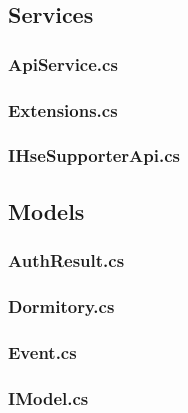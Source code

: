 \documentclass{../includes/TechDoc}
\begin{document}
    \subsection{Services}

    \subsubsection{ApiService.cs}
    

    \subsubsection{Extensions.cs}
    

    \subsubsection{IHseSupporterApi.cs}
    

    \subsection{Models}

    \subsubsection{AuthResult.cs}
    

    \subsubsection{Dormitory.cs}
    

    \subsubsection{Event.cs}
    

    \subsubsection{IModel.cs}
    
\end{document}
